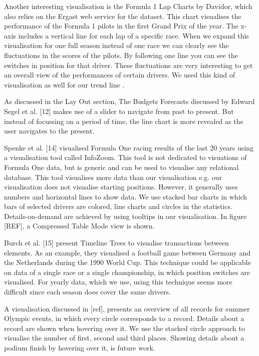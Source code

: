 \documentclass{sigchi}
\begin{document}
Another interesting visualisation is the Formula 1 Lap Charts by Davidor, which also relies on the Ergast web service for the dataset. This chart visualises the performance of the Formula 1 pilots in the first Grand Prix of the year. The x-axis includes a vertical line for each lap of a specific race. When we expand this visualisation for one full season instead of one race we can clearly see the fluctuations in the scores of the pilots. By following one line you can see the switches in position for that driver. These fluctuations are very interesting to get an overall view of the performances of certain drivers. We used this kind of visualisation as well for our trend line .

As discussed in the Lay Out section, The Budgets Forecasts discussed by Edward Segel et al. [12] makes use of a slider to navigate from past to present. But instead of focussing on a period of time, the line chart is more revealed as the user navigates to the present.



Spenke et al. [14] visualised Formula One racing results of the last 20 years using a visualisation tool called InfoZoom. This tool is not dedicated to visuations of Formula One data, but is generic and can be used to visualise any relational database. This tool visualises more data than our visualisation e.g. our visualisation does not visualise starting positions. However, it generally uses numbers and horizontal lines to show data. We use stacked bar charts in which bars of selected drivers are colored, line charts and circles in the statistics. Details-on-demand are achieved by using tooltips in our visualisation. In figure [REF], a Compressed Table Mode view is shown.


Burch et al. [15] present Timeline Trees to visualise transactions between elements. As an example, they visualised a football game between Germany and the Netherlands during the 1990 World Cup. This technique could be applicable on data of a single race or a single championship, in which position switches are visualised. For yearly data, which we use, using this technique seems more difficult since each season does cover the same drivers. 

A visualisation discussed in [ref], presents an overview of all records for summer Olympic events, in which every circle corresponds to a record. Details about a record are shown when hovering over it. We use the stacked circle approach to visualise the number of first, second and third places. Showing details about a podium finish by hovering over it, is future work.  
\end{document}

